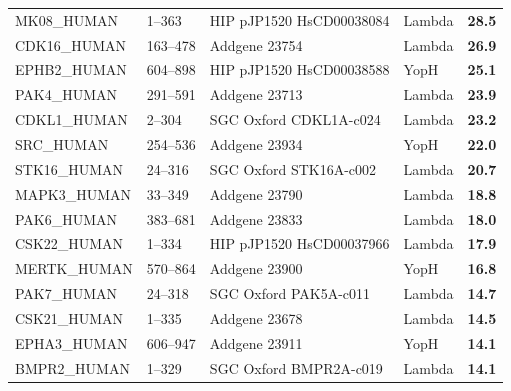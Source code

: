 \documentclass[phd,tocprelim]{cornell}
\begin{document}
\begin{landscape}
\begin{longtable}[c]{lllll}
		MK08\_HUMAN  & 1--363 & HIP pJP1520 HsCD00038084 & Lambda                    & \cellcolor{forestgreen!55}\bf{28.5}                            \\
		CDK16\_HUMAN &163--478 & Addgene 23754 & Lambda                    & \cellcolor{forestgreen!55}\bf{26.9}                            \\
		EPHB2\_HUMAN &604--898& HIP pJP1520 HsCD00038588 & YopH         & \cellcolor{forestgreen!55}\bf{25.1}                            \\
		PAK4\_HUMAN  &291--591 & Addgene 23713 & Lambda                    & \cellcolor{forestgreen!55}\bf{23.9}                            \\
		CDKL1\_HUMAN & 2--304& SGC Oxford CDKL1A-c024 & Lambda                    & \cellcolor{forestgreen!55}\bf{23.2}                            \\
		SRC\_HUMAN   & 254--536 & Addgene 23934 & YopH         & \cellcolor{forestgreen!55}\bf{22.0}                            \\
		STK16\_HUMAN & 24--316 & SGC Oxford STK16A-c002 & Lambda                    & \cellcolor{forestgreen!55}\bf{20.7}                            \\
		MAPK3\_HUMAN & 33--349 & Addgene 23790 & Lambda                    & \cellcolor{forestgreen!55}\bf{18.8}                            \\
		PAK6\_HUMAN  & 383--681 & Addgene 23833 & Lambda                    & \cellcolor{forestgreen!55}\bf{18.0}                            \\
		CSK22\_HUMAN & 1--334 & HIP pJP1520 HsCD00037966 & Lambda                    & \cellcolor{forestgreen!55}\bf{17.9}                            \\
		MERTK\_HUMAN & 570--864 & Addgene 23900 & YopH         & \cellcolor{forestgreen!55}\bf{16.8}                            \\
		PAK7\_HUMAN  & 24--318 & SGC Oxford PAK5A-c011 & Lambda                    & \cellcolor{forestgreen!55}\bf{14.7}                            \\
		CSK21\_HUMAN & 1--335 & Addgene 23678 & Lambda                    & \cellcolor{forestgreen!55}\bf{14.5}                            \\
		EPHA3\_HUMAN & 606--947 & Addgene 23911 & YopH         & \cellcolor{forestgreen!55}\bf{14.1}                            \\
		BMPR2\_HUMAN & 1--329 & SGC Oxford BMPR2A-c019 & Lambda                    & \cellcolor{forestgreen!55}\bf{14.1}                            \\

\end{longtable}
\end{landscape}
\end{document}
